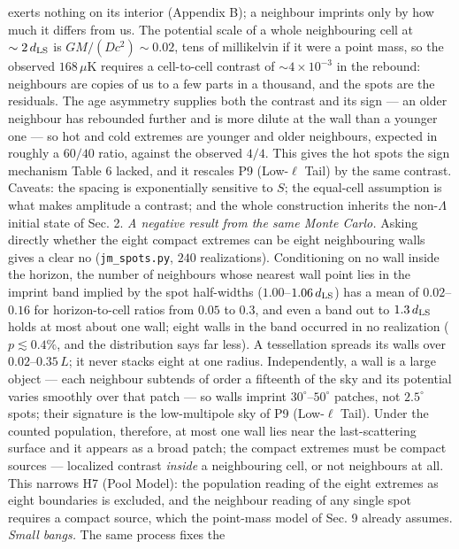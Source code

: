 \documentclass[
  11pt,
]{article}
\begin{document}
exerts nothing on its interior (Appendix B); a neighbour imprints only
by how much it differs from us. The potential scale of a whole
neighbouring cell at \(\sim 2\,d_{\rm LS}\) is \(GM/(Dc^2) \sim 0.02\),
tens of millikelvin if it were a point mass, so the observed
\(168\,\mu\)K requires a cell-to-cell contrast of
\(\sim 4\times10^{-3}\) in the rebound: neighbours are copies of us to a
few parts in a thousand, and the spots are the residuals. The age
asymmetry supplies both the contrast and its sign --- an older neighbour
has rebounded further and is more dilute at the wall than a younger one
--- so hot and cold extremes are younger and older neighbours, expected
in roughly a \(60/40\) ratio, against the observed \(4/4\). This gives
the hot spots the sign mechanism Table 6 lacked, and it rescales P9
(Low-\(\ell\) Tail) by the same contrast. Caveats: the spacing is
exponentially sensitive to \(S\); the equal-cell assumption is what
makes amplitude a contrast; and the whole construction inherits the
non-\(\Lambda\) initial state of Sec. 2. \emph{A negative result from
the same Monte Carlo.} Asking directly whether the eight compact
extremes can be eight neighbouring walls gives a clear no
(\texttt{jm\_spots.py}, \(240\) realizations). Conditioning on no wall
inside the horizon, the number of neighbours whose nearest wall point
lies in the imprint band implied by the spot half-widths
(\(1.00\)--\(1.06\,d_{\rm LS}\)) has a mean of \(0.02\)--\(0.16\) for
horizon-to-cell ratios from \(0.05\) to \(0.3\), and even a band out to
\(1.3\,d_{\rm LS}\) holds at most about one wall; eight walls in the
band occurred in no realization (\(p \lesssim 0.4\%\), and the
distribution says far less). A tessellation spreads its walls over
\(0.02\)--\(0.35\,L\); it never stacks eight at one radius.
Independently, a wall is a large object --- each neighbour subtends of
order a fifteenth of the sky and its potential varies smoothly over that
patch --- so walls imprint \(30^\circ\)--\(50^\circ\) patches, not
\(2.5^\circ\) spots; their signature is the low-multipole sky of P9
(Low-\(\ell\) Tail). Under the counted population, therefore, at most
one wall lies near the last-scattering surface and it appears as a broad
patch; the compact extremes must be compact sources --- localized
contrast \emph{inside} a neighbouring cell, or not neighbours at all.
This narrows H7 (Pool Model): the population reading of the eight
extremes as eight boundaries is excluded, and the neighbour reading of
any single spot requires a compact source, which the point-mass model of
Sec. 9 already assumes. \emph{Small bangs.} The same process fixes the
\end{document}
